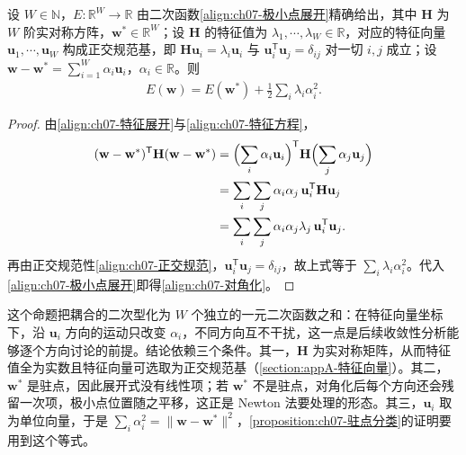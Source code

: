 \documentclass[../../main.tex]{subfiles}
\begin{document}
\begin{proposition}[特征向量坐标下的误差函数]\label{proposition:ch07-特征分解}
设 $W\in\mathbb{N}$，$E:\mathbb{R}^{W}\to\mathbb{R}$ 由二次函数\eqref{align:ch07-极小点展开}精确给出，其中 $\mathbf{H}$ 为 $W$ 阶实对称方阵，$\mathbf{w}^{\ast}\in\mathbb{R}^{W}$；设 $\mathbf{H}$ 的特征值为 $\lambda_{1},\cdots,\lambda_{W}\in\mathbb{R}$，对应的特征向量 $\mathbf{u}_{1},\cdots,\mathbf{u}_{W}$ 构成正交规范基，即 $\mathbf{H}\mathbf{u}_{i}=\lambda_{i}\mathbf{u}_{i}$ 与 $\mathbf{u}_{i}^{\mathsf T}\mathbf{u}_{j}=\delta_{ij}$ 对一切 $i,j$ 成立；设 $\mathbf{w}-\mathbf{w}^{\ast}=\sum_{i=1}^{W}\alpha_{i}\mathbf{u}_{i}$，$\alpha_{i}\in\mathbb{R}$。则
\begin{align}
E(\mathbf{w}) = E(\mathbf{w}^{\ast})+\frac{1}{2}\sum_i\lambda_i\alpha_i^{2}.
\label{align:ch07-对角化}
\end{align}
\end{proposition}
\begin{proof}
由\eqref{align:ch07-特征展开}与\eqref{align:ch07-特征方程}，
\begin{align*}
(\mathbf{w}-\mathbf{w}^{\ast})^{\mathsf T}\mathbf{H}(\mathbf{w}-\mathbf{w}^{\ast})
&= \Bigl(\sum_i\alpha_i\mathbf{u}_i\Bigr)^{\mathsf T}\mathbf{H}\Bigl(\sum_j\alpha_j\mathbf{u}_j\Bigr)\\
&= \sum_i\sum_j\alpha_i\alpha_j\,\mathbf{u}_i^{\mathsf T}\mathbf{H}\mathbf{u}_j\\
&= \sum_i\sum_j\alpha_i\alpha_j\lambda_j\,\mathbf{u}_i^{\mathsf T}\mathbf{u}_j.
\end{align*}
再由正交规范性\eqref{align:ch07-正交规范}，$\mathbf{u}_i^{\mathsf T}\mathbf{u}_j=\delta_{ij}$，故上式等于 $\sum_i\lambda_i\alpha_i^{2}$。代入\eqref{align:ch07-极小点展开}即得\eqref{align:ch07-对角化}。
\end{proof}

\begin{remark}
这个命题把耦合的二次型化为 $W$ 个独立的一元二次函数之和：在特征向量坐标下，沿 $\mathbf{u}_i$ 方向的运动只改变 $\alpha_i$，不同方向互不干扰，这一点是后续收敛性分析能够逐个方向讨论的前提。结论依赖三个条件。其一，$\mathbf{H}$ 为实对称矩阵，从而特征值全为实数且特征向量可选取为正交规范基（\cref{section:appA-特征向量}）。其二，$\mathbf{w}^{\ast}$ 是驻点，因此展开式没有线性项；若 $\mathbf{w}^{\ast}$ 不是驻点，对角化后每个方向还会残留一次项，极小点位置随之平移，这正是 Newton 法要处理的形态。其三，$\mathbf{u}_i$ 取为单位向量，于是 $\sum_i\alpha_i^{2}=\|\mathbf{w}-\mathbf{w}^{\ast}\|^{2}$，\cref{proposition:ch07-驻点分类}的证明要用到这个等式。
\end{remark}
\end{document}
